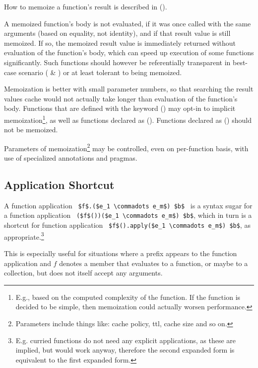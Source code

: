 How to memoize a function's result is described in ().

A memoized function's body is not evaluated, if it was once called with the same arguments (based on equality, not identity), and if that result value is still memoized. If so, the memoized result value is immediately returned without evaluation of the function's body, which can speed up execution of some functions significantly. Such functions should however be referentially transparent in best-case scenario ( \& ) or at least tolerant to being memoized. 

Memoization is better with small parameter numbers, so that searching the result values cache would not actually take longer than evaluation of the function's body. Functions that are defined with the  keyword () may opt-in to implicit memoization\footnote{E.g., based on the computed complexity of the function. If the function is decided to be simple, then memoization could actually worsen performance.}, as well as functions declared as  (). Functions declared as  () should not be memoized. 

Parameters of memoization\footnote{Parameters include things like: cache policy, ttl, cache size and so on.} may be controlled, even on per-function basis, with use of specialized annotations and pragmas. 




\subsection{Application Shortcut}
\label{sec:function-application-shortcut}

A function application ~\lstinline!$f$.($e_1 \commadots e_m$) $b$!~ is a syntax sugar for a function application ~\lstinline!($f$())($e_1 \commadots e_m$) $b$!, which in turn is a shortcut for function application ~\lstinline!$f$().apply($e_1 \commadots e_m$) $b$!, as appropriate.\footnote{E.g. curried functions do not need any explicit  applications, as these are implied, but would work anyway, therefore the second expanded form is equivalent to the first expanded form.}

This is especially useful for situations where a prefix appears to the function application and $f$ denotes a member that evaluates to a function, or maybe to a collection, but does not itself accept any arguments. 

